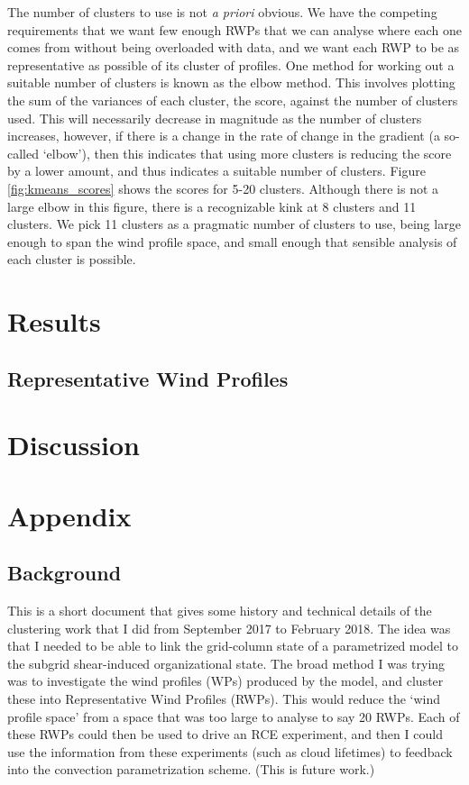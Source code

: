 \documentclass{article}
\begin{document}
The number of clusters to use is not \textit{a priori} obvious. We have the competing requirements that we want few enough RWPs that we can analyse where each one comes from without being overloaded with data, and we want each RWP to be as representative as possible of its cluster of profiles. One method for working out a suitable number of clusters is known as the elbow method. This involves plotting the sum of the variances of each cluster, the score, against the number of clusters used. This will necessarily decrease in magnitude as the number of clusters increases, however, if there is a change in the rate of change in the gradient (a so-called `elbow'), then this indicates that using more clusters is reducing the score by a lower amount, and thus indicates a suitable number of clusters. Figure \ref{fig:kmeans_scores} shows the scores for 5-20 clusters. Although there is not a large elbow in this figure, there is a recognizable kink at 8 clusters and 11 clusters. We pick 11 clusters as a pragmatic number of clusters to use, being large enough to span the wind profile space, and small enough that sensible analysis of each cluster is possible.

\section{Results}

\subsection{Representative Wind Profiles}

\section{Discussion}

\newpage
\section*{Appendix}

\subsection*{Background}

This is a short document that gives some history and technical details of the clustering work that I did from September 2017 to February 2018. The idea was that I needed to be able to link the grid-column state of a parametrized model to the subgrid shear-induced organizational state. The broad method I was trying was to investigate the wind profiles (WPs) produced by the model, and cluster these into Representative Wind Profiles (RWPs). This would reduce the `wind profile space' from a space that was too large to analyse to say 20 RWPs. Each of these RWPs could then be used to drive an RCE experiment, and then I could use the information from these experiments (such as cloud lifetimes) to feedback into the convection parametrization scheme. (This is future work.)
\end{document}
